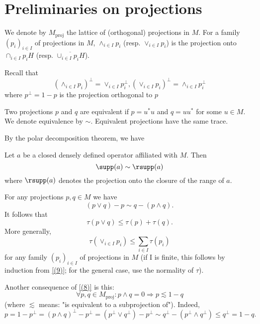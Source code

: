 \section{Preliminaries on projections}
We denote by $M_{\text{proj}}$ the lattice of (orthogonal) projections in $M$. For a family $(p_i)_{i\in I}$ of projections in $M$, $\wedge_{i\in I}p_i$ (resp. $\vee_{i\in I}p_i$) is the projection onto $\cap_{i\in I}p_iH$ (resp. $\overline{\cup_{i\in I}p_iH}$).\par
Recall that
\begin{equation}
    (\wedge_{i\in I}p_i)^\perp=\vee_{i\in I}p_i^\perp, (\vee_{i\in I}p_i)^\perp=\wedge_{i\in I}p_i^\perp
\end{equation}
where $p^\perp=1-p$ is the projection orthogonal to $p$\par
Two projections $p$ and $q$ are equivalent if $p=u^*u$ and $q=uu^*$ for some $u\in M$. We denote equivalence by $\sim$. Equivalent projections have the same trace.\par
By the polar decomposition theorem, we have
\begin{lemma}
    Let $a$ be a closed densely defined operator affiliated
with $M$. Then
\[
    \supp(a)\sim \rsupp(a)
\]
where $\rsupp(a)$ denotes the projection onto the closure of the range of $a$.
\end{lemma}
For any projections $p,q\in M$ we have
\begin{equation}\label{(8)}
    (p\vee q)-p\sim q-(p\wedge q).
\end{equation}
It follows that
\begin{equation}\label{(9)}
    \tau(p\vee q)\leq \tau(p)+\tau(q).
\end{equation}
More generally,
\begin{equation}
    \tau(\vee_{i\in I}p_i)\leq \sum_{i\in I}\tau(p_i)
\end{equation}
for any family $(p_i)_{i\in I}$ of projections in $M$ (if I is finite, this follows by induction from \eqref{(9)}; for the general case, use the normality of $\tau$).\par
Another consequence of \eqref{(8)} is this:
\begin{equation}\label{(11)}
    \forall p,q\in M_{\text{proj}}: p\wedge q=0\Rightarrow p\lesssim 1-q
\end{equation}
(where $\lesssim$ means: "is equivalent to a subprojection of"). Indeed,
\[
    p=1-p^\perp=(p\wedge q)^\perp-p^\perp=(p^\perp\vee q^\perp)-p^\perp\sim q^\perp-(p^\perp \wedge q^\perp)\leq q^\perp=1-q.
\]
